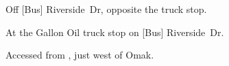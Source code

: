
\begin{LocationList}

Off [Bus] Riverside~Dr, opposite the truck stop.

At the Gallon Oil truck stop on [Bus] Riverside~Dr.

Accessed from , just west of Omak.

\end{LocationList}
